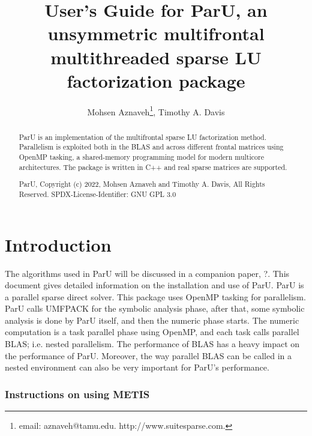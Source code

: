 \documentclass[12pt]{article}
\title{User's Guide for ParU, an unsymmetric multifrontal multithreaded sparse
LU factorization package}
\author{Mohsen Aznaveh\thanks{
email: aznaveh@tamu.edu.
http://www.suitesparse.com.
},
Timothy A. Davis}
\begin{document}
\maketitle

\begin{abstract}

ParU is an implementation of the multifrontal sparse LU factorization
method.  Parallelism is exploited both in the BLAS and across different frontal
matrices using OpenMP tasking, a shared-memory programming model for modern 
multicore architectures. The package is written in C++ and real sparse matrices 
are supported.

ParU, Copyright (c) 2022, Mohsen Aznaveh and Timothy A. Davis,
All Rights Reserved.
SPDX-License-Identifier: GNU GPL 3.0
\end{abstract}

\maketitle

\section{Introduction}
\label{intro}

The algorithms used in ParU will be discussed in a companion paper,
?. This document gives detailed information on the installation
and use of ParU.
ParU is a parallel sparse direct solver. This package uses OpenMP
tasking for parallelism. ParU calls UMFPACK for the symbolic analysis phase,
after that, some symbolic analysis is done by ParU itself, and  then the numeric
phase starts. The numeric computation is a task parallel phase using OpenMP, 
and each task calls parallel BLAS; i.e. nested parallelism. 
The performance of BLAS has a heavy impact on the performance of ParU. Moreover,
the way parallel BLAS can be called in a nested environment can also be very
important for ParU's performance.


\subsubsection{Instructions on using METIS}
\end{document}

